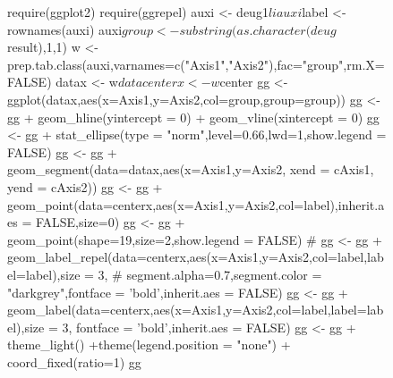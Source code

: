 \documentclass[a4paper,10pt]{article}
\begin{document}
\begin{Schunk}
\end{Schunk}


\begin{figure}[H]
\begin{center}
\begin{Schunk}
\begin{Sinput}
  require(ggplot2)
  require(ggrepel)
  auxi <- deug1$li
  auxi$label <- rownames(auxi)
  auxi$group <- substring(as.character(deug$result),1,1)
  w <- prep.tab.class(auxi,varnames=c("Axis1","Axis2"),fac="group",rm.X=FALSE)
  datax <- w$data
  centerx <- w$center
  gg <- ggplot(datax,aes(x=Axis1,y=Axis2,col=group,group=group)) 
  gg <- gg + geom_hline(yintercept = 0) + geom_vline(xintercept = 0)
  gg <- gg +  stat_ellipse(type = "norm",level=0.66,lwd=1,show.legend = FALSE)
  gg <- gg + geom_segment(data=datax,aes(x=Axis1,y=Axis2, xend = cAxis1, yend = cAxis2))
  gg <- gg + geom_point(data=centerx,aes(x=Axis1,y=Axis2,col=label),inherit.aes = FALSE,size=0)
  gg <- gg + geom_point(shape=19,size=2,show.legend = FALSE)
  # gg <- gg + geom_label_repel(data=centerx,aes(x=Axis1,y=Axis2,col=label,label=label),size = 3,
  #                             segment.alpha=0.7,segment.color = "darkgrey",fontface = 'bold',inherit.aes = FALSE)
  gg <- gg + geom_label(data=centerx,aes(x=Axis1,y=Axis2,col=label,label=label),size = 3,
                             fontface = 'bold',inherit.aes = FALSE)
  gg <- gg + theme_light() +theme(legend.position = "none") + coord_fixed(ratio=1)
  gg
  

\end{Sinput}
\end{Schunk}
\end{center}
\end{figure}
\end{document}
